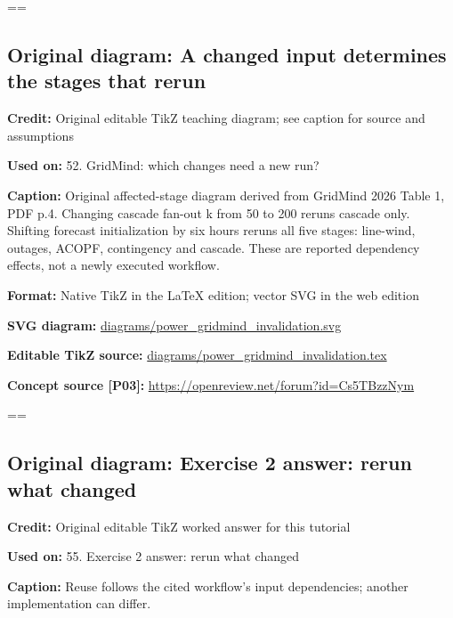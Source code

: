 \documentclass[10pt,letterpaper]{article}
\begin{document}
\egroup\par\noindent\box\readingEntry\par\medskip
\setbox\readingEntry=\vbox\bgroup\hsize=\linewidth\subsection*{Original diagram: A changed input determines the stages that rerun}
\textbf{Credit:} Original editable TikZ teaching diagram; see caption for source and assumptions\par
\textbf{Used on:} 52. GridMind: which changes need a new run?\par
\textbf{Caption:} Original affected-stage diagram derived from GridMind 2026 Table 1, PDF p.4. Changing cascade fan-out k from 50 to 200 reruns cascade only. Shifting forecast initialization by six hours reruns all five stages: line-wind, outages, ACOPF, contingency and cascade. These are reported dependency effects, not a newly executed workflow.\par
\textbf{Format:} Native TikZ in the LaTeX edition; vector SVG in the web edition\par
\textbf{SVG diagram:} \href{diagrams/power_gridmind_invalidation.svg}{\small\ttfamily diagrams/\allowbreak{}power\_\allowbreak{}gridmind\_\allowbreak{}invalidation.\allowbreak{}svg}\par
\textbf{Editable TikZ source:} \href{diagrams/power_gridmind_invalidation.tex}{\small\ttfamily diagrams/\allowbreak{}power\_\allowbreak{}gridmind\_\allowbreak{}invalidation.\allowbreak{}tex}\par
\textbf{Concept source [P03]:} \href{https://openreview.net/forum?id=Cs5TBzzNym}{\small\ttfamily https:/\allowbreak{}/\allowbreak{}openreview.\allowbreak{}net/\allowbreak{}forum?\allowbreak{}id=\allowbreak{}Cs5TBzzNym}\par
\egroup\par\noindent\box\readingEntry\par\medskip
\setbox\readingEntry=\vbox\bgroup\hsize=\linewidth\subsection*{Original diagram: Exercise 2 answer: rerun what changed}
\textbf{Credit:} Original editable TikZ worked answer for this tutorial\par
\textbf{Used on:} 55. Exercise 2 answer: rerun what changed\par
\textbf{Caption:} Reuse follows the cited workflow's input dependencies; another implementation can differ.\par
\end{document}
